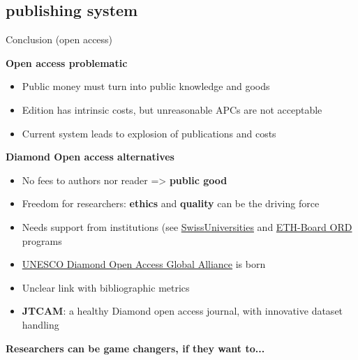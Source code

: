 \documentclass[10pt,compress,serif,aspectratio=169]{beamer}
\begin{document}
\subsection{publishing system}
\begin{frame}[t]{Conclusion (open access)}

  \textbf{Open access problematic}  
  \begin{itemize}
  \item Public money must turn into public knowledge and goods
  \item Edition has intrinsic costs, but unreasonable APCs are not acceptable
  \item Current system leads to explosion of publications and costs
  \end{itemize}
\vfill
  \textbf{Diamond Open access alternatives}  
  \begin{itemize}
  \item No fees to authors nor reader => \textbf{public good}
  \item Freedom for researchers: \textbf{ethics} and \textbf{quality} can be the driving force
  \item Needs support from institutions (see \href{https://www.swissuniversities.ch/en/topics/open-science/open-science-programme/chord}{SwissUniversities} and \href{https://ethrat.ch/en/measure-1-calls-for-field-specific-actions/}{ETH-Board ORD} programs
  \item \href{https://www.unesco.org/en/articles/announcing-global-diamond-open-access-alliance}{UNESCO Diamond Open Access Global Alliance} is born
  \item Unclear link with bibliographic metrics
  \item \textbf{JTCAM}: a healthy Diamond open access journal, with innovative dataset handling
  \end{itemize}
\vfill
\begin{center}
\Large  \textbf{Researchers can be game changers, if they want to...}
\end{center}
\end{frame}

\end{document}

